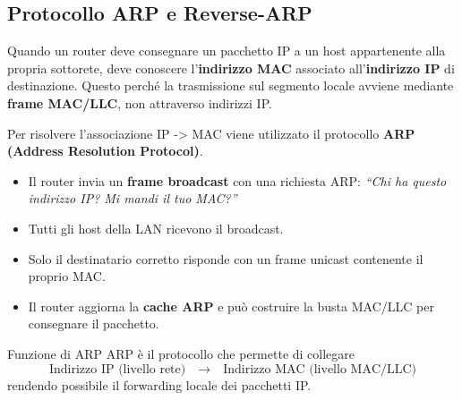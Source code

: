 \documentclass[a4paper,12pt]{report}
\begin{document}
\newpage
\subsection{Protocollo ARP e Reverse-ARP}

Quando un router deve consegnare un pacchetto IP a un host appartenente alla propria sottorete,
deve conoscere l'\textbf{indirizzo MAC} associato all'\textbf{indirizzo IP} di destinazione.
Questo perché la trasmissione sul segmento locale avviene mediante \textbf{frame MAC/LLC}, non
attraverso indirizzi IP.

Per risolvere l'associazione IP -> MAC viene utilizzato il protocollo
\textbf{ARP (Address Resolution Protocol)}.

\begin{itemize}
    \item Il router invia un \textbf{frame broadcast} con una richiesta ARP:  
          \textit{``Chi ha questo indirizzo IP? Mi mandi il tuo MAC?''}
    \item Tutti gli host della LAN ricevono il broadcast.
    \item Solo il destinatario corretto risponde con un frame unicast contenente il proprio MAC.
    \item Il router aggiorna la \textbf{cache ARP} e può costruire la busta MAC/LLC per consegnare il pacchetto.
\end{itemize}
\begin{defbox}{Funzione di ARP}
ARP è il protocollo che permette di collegare
\[
    \text{Indirizzo IP (livello rete)} \quad \longrightarrow \quad
    \text{Indirizzo MAC (livello MAC/LLC)}
\]
rendendo possibile il forwarding locale dei pacchetti IP.
\end{defbox}
\end{document}
